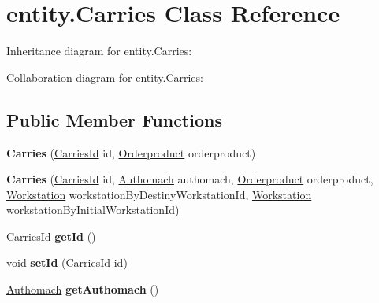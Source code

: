 \hypertarget{classentity_1_1_carries}{}\section{entity.\+Carries Class Reference}
\label{classentity_1_1_carries}


Inheritance diagram for entity.\+Carries\+:


Collaboration diagram for entity.\+Carries\+:
\subsection*{Public Member Functions}
\begin{DoxyCompactItemize}
\item 
\mbox{\label{classentity_1_1_carries_acf6db6a8bebc1383fb44b5d1a69db994}} 
{\bfseries Carries} (\mbox{\hyperlink{classentity_1_1_carries_id}{Carries\+Id}} id, \mbox{\hyperlink{classentity_1_1_orderproduct}{Orderproduct}} orderproduct)
\item 
\mbox{\label{classentity_1_1_carries_a61138413c175da3c338dd6d3faf5034d}} 
{\bfseries Carries} (\mbox{\hyperlink{classentity_1_1_carries_id}{Carries\+Id}} id, \mbox{\hyperlink{classentity_1_1_authomach}{Authomach}} authomach, \mbox{\hyperlink{classentity_1_1_orderproduct}{Orderproduct}} orderproduct, \mbox{\hyperlink{classentity_1_1_workstation}{Workstation}} workstation\+By\+Destiny\+Workstation\+Id, \mbox{\hyperlink{classentity_1_1_workstation}{Workstation}} workstation\+By\+Initial\+Workstation\+Id)
\item 
\mbox{\label{classentity_1_1_carries_af1a678cc4d0ded3e9fecbf0a17a2ba3c}} 
\mbox{\hyperlink{classentity_1_1_carries_id}{Carries\+Id}} {\bfseries get\+Id} ()
\item 
\mbox{\label{classentity_1_1_carries_a23d2ab3f05610f37bca03e7cc08ced73}} 
void {\bfseries set\+Id} (\mbox{\hyperlink{classentity_1_1_carries_id}{Carries\+Id}} id)
\item 
\mbox{\label{classentity_1_1_carries_a539e6149274e7be94d86999d02af82d1}} 
\mbox{\hyperlink{classentity_1_1_authomach}{Authomach}} {\bfseries get\+Authomach} ()
\item 

\end{DoxyCompactItemize}
